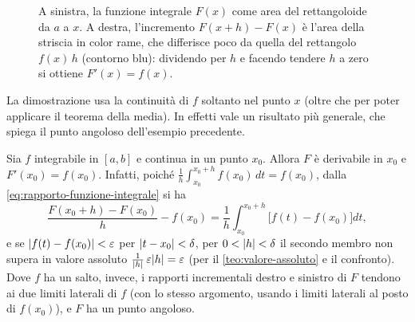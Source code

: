 \begin{figure}[htb]
\centering
{}
\caption{A sinistra, la funzione integrale $F(x)$ come area del rettangoloide da $a$ a
$x$. A destra, l'incremento $F(x+h)-F(x)$ è l'area della striscia in color rame, che
differisce poco da quella del rettangolo $f(x)\,h$ (contorno blu): dividendo per $h$ e
facendo tendere $h$ a zero si ottiene $F'(x)=f(x)$.}
\label{fig:teorema-fondamentale}
\end{figure}

La dimostrazione usa la continuità di $f$ soltanto nel punto $x$ (oltre che per poter
applicare il teorema della media). In effetti vale un risultato più generale, che spiega
il punto angoloso dell'esempio precedente.

\begin{osservazione}\label{oss:fondamentale-puntuale}
Sia $f$ integrabile in $[a,b]$ e continua in un punto $x_{0}$. Allora $F$ è derivabile
in $x_{0}$ e $F'(x_{0})=f(x_{0})$. Infatti, poiché $\frac1h\int_{x_{0}}^{x_{0}+h}f(x_{0})\,dt
=f(x_{0})$, dalla \eqref{eq:rapporto-funzione-integrale} si ha
\[
  \frac{F(x_{0}+h)-F(x_{0})}h-f(x_{0})=\frac1h\int_{x_{0}}^{x_{0}+h}\bigl[f(t)-f(x_{0})\bigr]dt ,
\]
e se $\lvert f(t)-f(x_{0})\rvert<\varepsilon$ per $\lvert t-x_{0}\rvert<\delta$, per $0<\lvert h\rvert<\delta$ il secondo
membro non supera in valore assoluto $\frac1{\lvert h\rvert}\,\varepsilon\lvert h\rvert=\varepsilon$ (per il
\cref{teo:valore-assoluto} e il confronto). Dove $f$ ha un salto, invece, i rapporti
incrementali destro e sinistro di $F$ tendono ai due limiti laterali di $f$ (con lo
stesso argomento, usando i limiti laterali al posto di $f(x_{0})$), e $F$ ha un punto
angoloso.
\end{osservazione}


